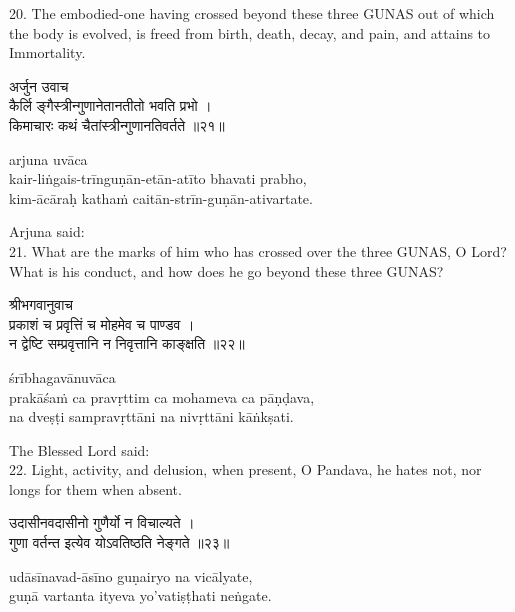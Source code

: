 20. The embodied-one having crossed beyond these three GUNAS out of which the
body is evolved, is freed from birth, death, decay, and pain, and attains to
Immortality.

\begin{gitaverse}
अर्जुन उवाच \\
कैर्लि ङ्गैस्त्रीन्गुणानेतानतीतो भवति प्रभो । \\
किमाचारः कथं चैतांस्त्रीन्गुणानतिवर्तते ॥२१॥
\end{gitaverse}

\begin{transliteration}
arjuna uvāca \\
kair-liṅgais-trīnguṇān-etān-atīto bhavati prabho, \\
kim-ācāraḥ kathaṁ caitān-strīn-guṇān-ativartate.
\end{transliteration}

Arjuna said: \\
21. What are the marks of him who has crossed over the three GUNAS, O Lord?
What is his conduct, and how does he go beyond these three GUNAS?\@

\begin{gitaverse}
श्रीभगवानुवाच \\
प्रकाशं च प्रवृत्तिं च मोहमेव च पाण्डव । \\
न द्वेष्टि सम्प्रवृत्तानि न निवृत्तानि काङ्क्षति ॥२२॥
\end{gitaverse}

\begin{transliteration}
śrībhagavānuvāca \\
prakāśaṁ ca pravṛttim ca mohameva ca pāṇḍava, \\
na dveṣṭi sampravṛttāni na nivṛttāni kāṅkṣati.
\end{transliteration}

The Blessed Lord said: \\
22. Light, activity, and delusion, when present, O Pandava, he hates not, nor
longs for them when absent.

\begin{gitaverse}
उदासीनवदासीनो गुणैर्यो न विचाल्यते । \\
गुणा वर्तन्त इत्येव योऽवतिष्ठति नेङ्गते ॥२३॥
\end{gitaverse}

\begin{transliteration}
udāsīnavad-āsīno guṇairyo na vicālyate, \\
guṇā vartanta ityeva yo'vatiṣṭhati neṅgate.
\end{transliteration}


